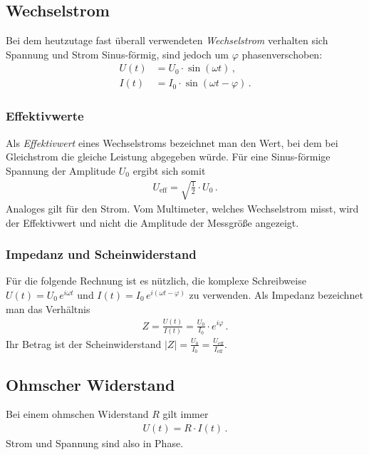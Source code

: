\documentclass[12pt,a4paper,titlepage,headinclude,bibtotoc]{scrartcl}
\begin{document}
\subsection{Wechselstrom}
Bei dem heutzutage fast überall verwendeten \textit{Wechselstrom} verhalten sich Spannung und Strom Sinus-förmig, sind jedoch um $\varphi$ phasenverschoben:
\begin{align}
	U(t)&=U_0\cdot\sin(\omega t)\,,\\
	I(t)&=I_0\cdot\sin(\omega t-\varphi)\,.
\end{align}

\subsubsection{Effektivwerte}
Als \textit{Effektivwert} eines Wechselstroms bezeichnet man den Wert, bei dem bei Gleichstrom die gleiche Leistung abgegeben würde.
Für eine Sinus-förmige Spannung der Amplitude $U_0$ ergibt sich somit
\begin{align}
	U_\text{eff}=\sqrt{\frac{1}{2}}\cdot U_0 \,.
\end{align}
Analoges gilt für den Strom.
Vom Multimeter, welches Wechselstrom misst, wird der Effektivwert und nicht die Amplitude der Messgröße angezeigt.

\subsubsection{Impedanz und Scheinwiderstand}
Für die folgende Rechnung ist es nützlich, die komplexe Schreibweise $U(t)=U_0 \, e^{i\omega t}$ und $I(t)=I_0 \, e^{i(\omega t - \varphi)}$ zu verwenden.
Als Impedanz bezeichnet man das Verhältnis
\begin{align}
	Z=\frac{U(t)}{I(t)}=\frac{U_0}{I_0}\cdot e^{i\varphi}\,.
\end{align}
Ihr Betrag ist der Scheinwiderstand $|Z|=\frac{U_0}{I_0}=\frac{U_\text{eff}}{I_\text{eff}}$.

\subsection{Ohmscher Widerstand}
Bei einem ohmschen Widerstand $R$ gilt immer
\begin{align}
	U(t)=R \cdot I(t)\,.
\end{align}
Strom und Spannung sind also in Phase.
\end{document}
